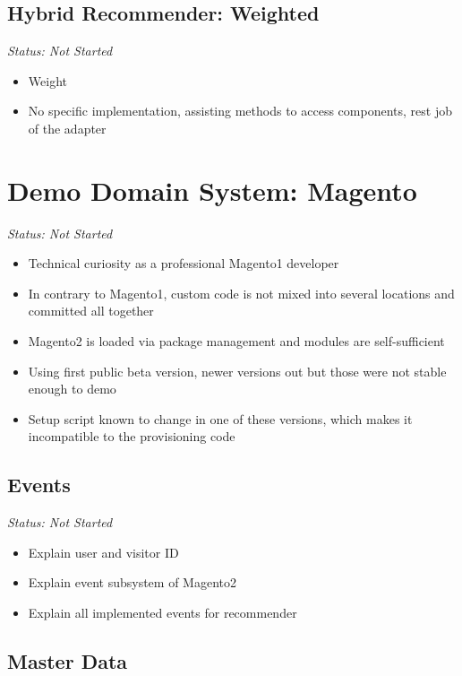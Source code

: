 \subsection{Hybrid Recommender: Weighted}

\emph{Status: Not Started}

\begin{itemize}
\item Weight
\item No specific implementation, assisting methods to access components, rest job of the adapter
\end{itemize}

\section{Demo Domain System: Magento}

\emph{Status: Not Started}

\begin{itemize}
\item Technical curiosity as a professional Magento1 developer
\item In contrary to Magento1, custom code is not mixed into several locations and committed all together
\item Magento2 is loaded via package management and modules are self-sufficient
\item Using first public beta version, newer versions out but those were not stable enough to demo
\item Setup script known to change in one of these versions, which makes it incompatible to the provisioning code
\end{itemize}

\subsection{Events}

\emph{Status: Not Started}

\begin{itemize}
\item Explain user and visitor ID
\item Explain event subsystem of Magento2
\item Explain all implemented events for recommender
\end{itemize}

\subsection{Master Data}


